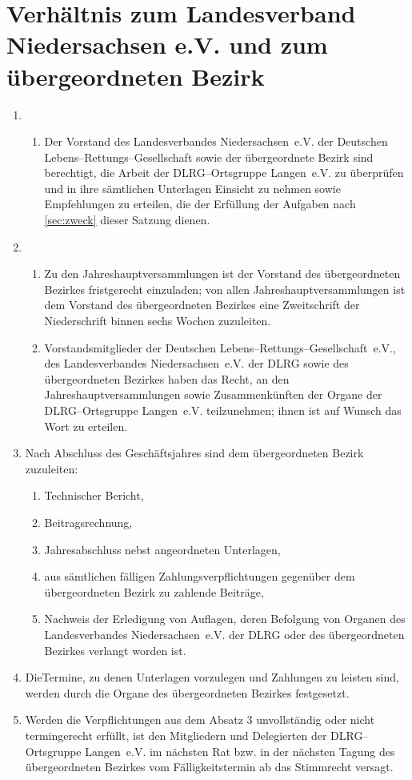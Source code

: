 \documentclass[%
12pt, %
a4paper, %
headsepline, %
footsepline, %
parskip, %
headings=normal, %
]{scrartcl}
\begin{document}
\section{Verhältnis zum Landesverband Niedersachsen e.V. und zum übergeordneten Bezirk}
\label{sec:verhaeltnis}
\begin{enumerate}
    \item \begin{enumerate}[noitemsep]
        \item Der Vorstand des Landesverbandes Niedersachsen~e.V. der Deutschen Lebens--Rettungs--Gesellschaft sowie der übergeordnete Bezirk sind berechtigt, die Arbeit der DLRG--Ortsgruppe Langen~e.V. zu überprüfen und in ihre sämtlichen Unterlagen Einsicht zu nehmen sowie Empfehlungen zu erteilen, die der Erfüllung der Aufgaben nach \ref{sec:zweck} dieser Satzung dienen.
      \end{enumerate}
    \item \begin{enumerate}[noitemsep]
        \item Zu den Jahreshauptversammlungen ist der Vorstand des übergeordneten Bezirkes fristgerecht einzuladen; von allen Jahreshauptversammlungen ist dem Vorstand des übergeordneten Bezirkes eine Zweitschrift der Niederschrift binnen sechs Wochen zuzuleiten.
        \item Vorstandsmitglieder der Deutschen Lebens--Rettungs--Gesellschaft~e.V., des Landesverbandes Niedersachsen~e.V. der DLRG sowie des übergeordneten Bezirkes haben das Recht, an den Jahreshauptversammlungen sowie Zusammenkünften der Organe der DLRG--Ortsgruppe Langen~e.V. teilzunehmen; ihnen ist auf Wunsch das Wort zu erteilen.
      \end{enumerate}
    \item Nach Abschluss des Geschäftsjahres sind dem übergeordneten Bezirk zuzuleiten: \begin{enumerate}[noitemsep]
        \item Technischer Bericht,
        \item Beitragsrechnung,
        \item Jahresabschluss nebst angeordneten Unterlagen,
        \item aus sämtlichen fälligen Zahlungsverpflichtungen gegenüber dem übergeordneten Bezirk zu zahlende Beiträge,
        \item Nachweis der Erledigung von Auflagen, deren Befolgung von Organen des Landesverbandes Niedersachsen~e.V. der DLRG oder des übergeordneten Bezirkes verlangt worden ist.
      \end{enumerate}
    \item DieTermine, zu denen Unterlagen vorzulegen und Zahlungen zu leisten sind, werden durch die Organe des übergeordneten Bezirkes festgesetzt.
    \item Werden die Verpflichtungen aus dem Absatz 3 unvollständig oder nicht termingerecht erfüllt, ist den Mitgliedern und Delegierten der DLRG--Ortsgruppe Langen~e.V. im nächsten Rat bzw. in der nächsten Tagung des übergeordneten Bezirkes vom Fälligkeitstermin ab das Stimmrecht versagt.
\end{enumerate}
\end{document}
